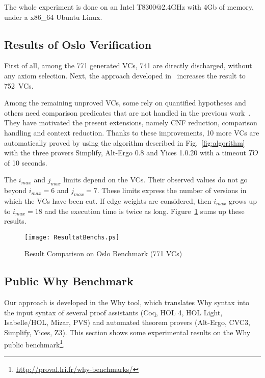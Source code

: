 \documentclass{acm_proc_article-sp}
\theoremstyle{nonumberplain}
\newcommand{\TO}{TO}
\begin{document}
The whole experiment is done on an Intel T8300@2.4GHz with 4Gb of 
memory, under a x86\_64 Ubuntu Linux.


\subsection{Results of Oslo Verification}\label{sub:oslo:res}
First of all, among the 771 generated VCs, 741  are directly 
discharged, without any axiom selection. Next, the approach
developed in~\cite{couchot07FTP} increases the result to
752~VCs.


Among the remaining unproved VCs, some rely on quantified hypotheses
and others need comparison predicates that are not handled 
in the previous work~\cite{couchot07FTP}.
They have motivated the present extensions, namely
CNF reduction, comparison handling and context reduction. 
Thanks to these improvements, 10 more VCs are automatically
proved by using the algorithm described in 
Fig.~\ref{fig:algorithm} with the three provers Simplify,
Alt-Ergo 0.8 and Yices 1.0.20 with a timeout $\TO$ of 10 seconds.

The $i_\textit{max}$ and $j_\textit{max}$ limits depend on the VCs.
Their observed values do not go beyond $i_\textit{max}=6$ and
$j_\textit{max}=7$. These limits express the number of versions in
which the VCs have been cut. If edge weights are considered, then
$i_\textit{max}$ grows up to $i_\textit{max}=18$ and the execution time
is twice as long.
Figure~\ref{fig:ComparisonDiagramme} sums up these results.


\begin{figure}[ht]
  \begin{center}
    \texttt{[image: ResultatBenchs.ps]}\\   
  \end{center}
  \caption{Result Comparison on Oslo Benchmark (771 VCs)}
  \label{fig:ComparisonDiagramme}
\end{figure}




\subsection{Public Why Benchmark}\label{sub:exp:whybenchs}
Our approach is developed in the Why tool, which translates Why syntax
into the input syntax of several proof assistants (Coq, HOL 4, HOL
Light, Isabelle/HOL, Mizar, PVS) and automated theorem provers
(Alt-Ergo, CVC3, Simplify, Yices, Z3). This section shows some
experimental results on the Why public
benchmark\footnote{\url{http://proval.lri.fr/why-benchmarks/}}.
\end{document}
